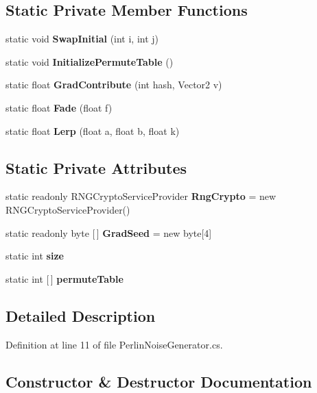 \subsection*{Static Private Member Functions}
\begin{DoxyCompactItemize}
\item 
static void \textbf{ Swap\+Initial} (int i, int j)
\item 
static void \textbf{ Initialize\+Permute\+Table} ()
\item 
static float \textbf{ Grad\+Contribute} (int hash, Vector2 v)
\item 
static float \textbf{ Fade} (float f)
\item 
static float \textbf{ Lerp} (float a, float b, float k)
\end{DoxyCompactItemize}
\subsection*{Static Private Attributes}
\begin{DoxyCompactItemize}
\item 
static readonly R\+N\+G\+Crypto\+Service\+Provider \textbf{ Rng\+Crypto} = new R\+N\+G\+Crypto\+Service\+Provider()
\item 
static readonly byte [$\,$] \textbf{ Grad\+Seed} = new byte[4]
\item 
static int \textbf{ size}
\item 
static int [$\,$] \textbf{ permute\+Table}
\end{DoxyCompactItemize}


\subsection{Detailed Description}


Definition at line 11 of file Perlin\+Noise\+Generator.\+cs.



\subsection{Constructor \& Destructor Documentation}
\mbox{\label{classMelloMario_1_1LevelGen_1_1PerlinNoiseGenerator_ae8a9da3a7ff36b8d48edd7edaae71d64}} 
